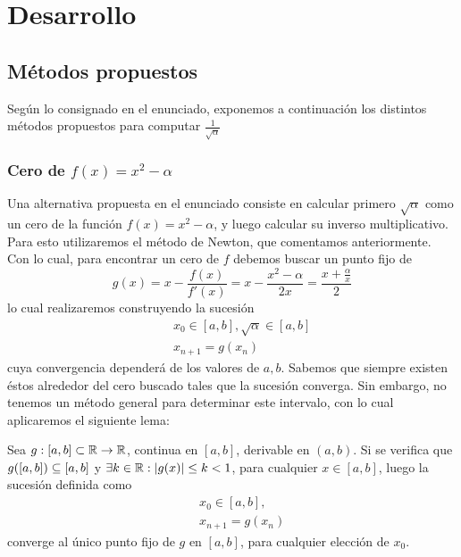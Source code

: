 \section{Desarrollo}
	\subsection{Métodos propuestos}
	
	Según lo consignado en el enunciado, exponemos a continuación los distintos métodos propuestos para computar $\frac{1}{\sqrt{\alpha}}$
		\subsubsection{Cero de $f(x) = x^2 -\alpha$}
		Una alternativa propuesta en el enunciado consiste en calcular primero $\sqrt{\alpha}$ como un cero de la función $f(x) = x^2 -\alpha$, y luego calcular su inverso multiplicativo. Para esto utilizaremos el método de Newton, que comentamos anteriormente. Con lo cual, para encontrar un cero de $f$ debemos buscar un punto fijo de 
		\begin{equation}
			g(x) = x - \frac{f(x)}{f'(x)} = x - \frac{x^2 - \alpha}{2x} = \frac{x + \frac{\alpha}{x}}{2}
		\label{g}	
		\end{equation}
lo cual realizaremos construyendo la sucesión
	\begin{eqnarray}
		&& x_0 \in [a,b], \sqrt{\alpha} \in [a,b] \nonumber \\
		&& x_{n+1} = g(x_n) \nonumber
	\end{eqnarray}
cuya convergencia dependerá de los valores de $a,b$. Sabemos que siempre existen éstos alrededor del cero buscado tales que la sucesión converga. Sin embargo, no tenemos un método general para determinar este intervalo, con lo cual aplicaremos el siguiente lema:
\begin{lema}
Sea $g: [a,b] \subset \mathbb{R} \rightarrow \mathbb{R}$, continua en $[a,b]$, derivable en $(a,b)$. Si se verifica que $g([a,b]) \subseteq [a,b]$ y $\exists k \in\mathbb{R} : |g(x)| \leq k < 1$, para cualquier $x\in [a,b]$, luego la sucesión definida como 
	\begin{eqnarray}
		&& x_0 \in [a,b], \nonumber \\
		&& x_{n+1} = g(x_n) \nonumber
	\end{eqnarray}
	converge al único punto fijo de $g$ en $[a,b]$, para cualquier elección de $x_0$.
\label{lemaConv}	
\end{lema}
